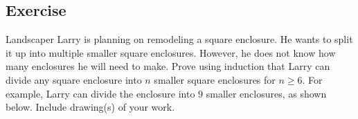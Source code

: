 \documentclass{article}
\newcounter{counter}
\newcommand{\Exercise}{Exercise \stepcounter{counter}\thecounter}
\begin{document}
\subsection*{\Exercise}
    Landscaper Larry is planning on remodeling a square enclosure. He wants to split it up into multiple smaller square enclosures. However, he does not know how many enclosures he will need to make. Prove using induction that Larry can divide any square enclosure into $n$ smaller square enclosures for $n \ge 6$. For example, Larry can divide the enclosure into $9$ smaller enclosures, as shown below. Include drawing(s) of your work.
    \begin{center}
        \newcommand{\backgroundcolor}{ForestGreen}
        \newcommand{\fibrecolor}{ForestGreen!90!black}
    \end{center}
\end{document}
